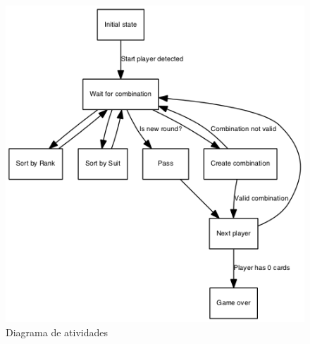 \documentclass[12pt]{article}
\begin{document}
\begin{figure}[h!]
	\centering
	\includegraphics[width=.8\textwidth]{activity.png}
	\caption{Diagrama de atividades}
	\label{activity}
\end{figure}
\end{document}
